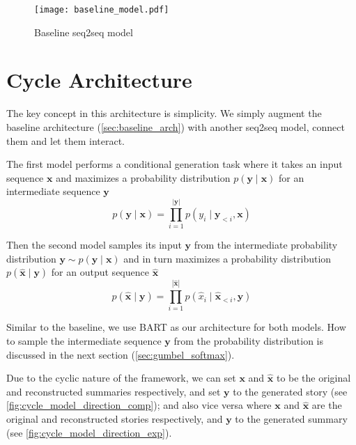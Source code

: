 \begin{figure}[ht]
\centering
\texttt{[image: baseline\_model.pdf]}
\caption{Baseline seq2seq model}
\label{fig:baseline_model}
\end{figure}



\section{Cycle Architecture}
\label{sec:cycle_arch}

The key concept in this architecture is simplicity. We simply augment the baseline architecture (\cref{sec:baseline_arch}) with another seq2seq model, connect them and let them interact.

The first model performs a conditional generation task where it takes an input sequence $\mathbf{x}$ and maximizes a probability distribution $p(\mathbf{y} \mid \mathbf{x})$ for an intermediate sequence $\mathbf{y}$
\[ p(\mathbf{y} \mid \mathbf{x}) = \prod_{i=1}^{|\mathbf{y}|} p(y_i \mid \mathbf{y}_{<i}, \mathbf{x})  \]

Then the second model samples its input $\mathbf{y}$ from the intermediate probability distribution $\mathbf{y} \sim p(\mathbf{y} \mid \mathbf{x})$ and in turn maximizes a probability distribution $p(\hat{\mathbf{x}} \mid \mathbf{y})$ for an output sequence $\hat{\mathbf{x}}$
\[ p(\hat{\mathbf{x}} \mid \mathbf{y}) = \prod_{i=1}^{|\hat{\mathbf{x}}|} p(\hat{x}_i \mid \hat{\mathbf{x}}_{<i}, \mathbf{y})  \]

Similar to the baseline, we use BART as our architecture for both models. How to sample the intermediate sequence $\mathbf{y}$ from the probability distribution is discussed in the next section (\cref{sec:gumbel_softmax}).

Due to the cyclic nature of the framework, we can set $\mathbf{x}$ and $\hat{\mathbf{x}}$ to be the original and reconstructed summaries respectively, and set $\mathbf{y}$ to the generated story (see \cref{fig:cycle_model_direction_comp}); and also vice versa where $\mathbf{x}$ and $\hat{\mathbf{x}}$ are the original and reconstructed stories respectively, and $\mathbf{y}$ to the generated summary (see \cref{fig:cycle_model_direction_exp}).

